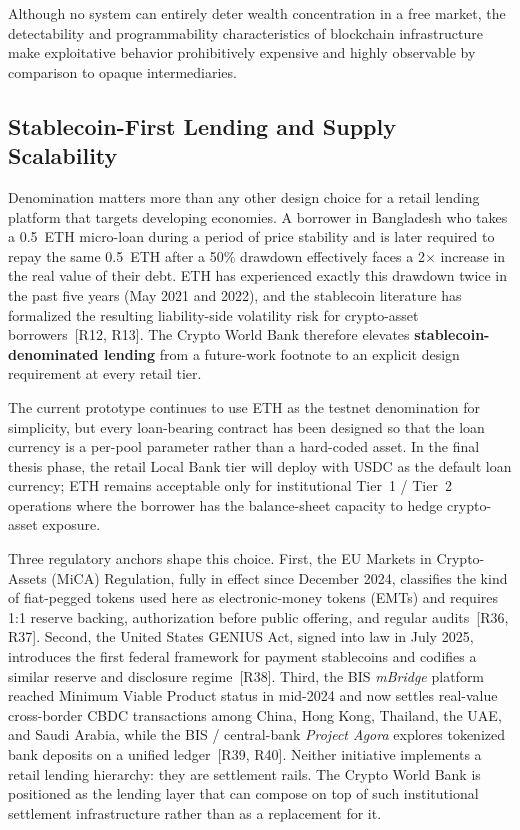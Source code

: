 \documentclass[12pt,a4paper]{report}
\begin{document}
Although no system can entirely deter wealth concentration in a free market, the detectability and programmability characteristics of blockchain infrastructure make exploitative behavior prohibitively expensive and highly observable by comparison to opaque intermediaries.

\subsection{Stablecoin-First Lending and Supply Scalability}
\label{sec:stablecoin-first}

Denomination matters more than any other design choice for a retail lending platform that targets developing economies. A borrower in Bangladesh who takes a 0.5~ETH micro-loan during a period of price stability and is later required to repay the same 0.5~ETH after a 50\% drawdown effectively faces a 2$\times$ increase in the real value of their debt. ETH has experienced exactly this drawdown twice in the past five years (May 2021 and 2022), and the stablecoin literature has formalized the resulting liability-side volatility risk for crypto-asset borrowers~[R12, R13]. The Crypto World Bank therefore elevates \textbf{stablecoin-denominated lending} from a future-work footnote to an explicit design requirement at every retail tier.

The current prototype continues to use ETH as the testnet denomination for simplicity, but every loan-bearing contract has been designed so that the loan currency is a per-pool parameter rather than a hard-coded asset. In the final thesis phase, the retail Local Bank tier will deploy with USDC as the default loan currency; ETH remains acceptable only for institutional Tier~1 / Tier~2 operations where the borrower has the balance-sheet capacity to hedge crypto-asset exposure.

Three regulatory anchors shape this choice. First, the EU Markets in Crypto-Assets (MiCA) Regulation, fully in effect since December 2024, classifies the kind of fiat-pegged tokens used here as electronic-money tokens (EMTs) and requires 1{:}1 reserve backing, authorization before public offering, and regular audits~[R36, R37]. Second, the United States GENIUS Act, signed into law in July 2025, introduces the first federal framework for payment stablecoins and codifies a similar reserve and disclosure regime~[R38]. Third, the BIS \textit{mBridge} platform reached Minimum Viable Product status in mid-2024 and now settles real-value cross-border CBDC transactions among China, Hong Kong, Thailand, the UAE, and Saudi Arabia, while the BIS / central-bank \textit{Project Agora} explores tokenized bank deposits on a unified ledger~[R39, R40]. Neither initiative implements a retail lending hierarchy: they are settlement rails. The Crypto World Bank is positioned as the lending layer that can compose on top of such institutional settlement infrastructure rather than as a replacement for it.
\end{document}
